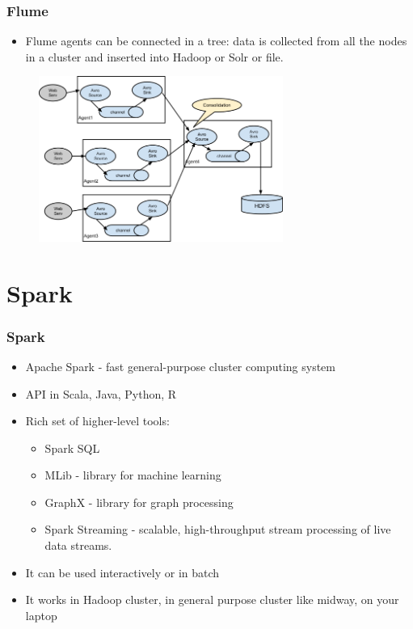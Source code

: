 \documentclass{beamer}
\begin{document}
\begin{frame}[fragile]
 \frametitle{Flume}
 \begin{itemize}
  \item Flume agents can be connected in a tree: data is collected from all the nodes in a cluster and inserted into Hadoop or Solr or file.
 \end{itemize}

 \begin{figure}[h]
 \includegraphics[width=8cm]{graphs/UserGuide_image02.png}
 \end{figure}
\end{frame}

\section{Spark}
\begin{frame}
 \frametitle{Spark}
 \begin{itemize}
  \item Apache Spark - fast general-purpose cluster computing system
  \item API in Scala, Java, Python, R
  \item Rich set of higher-level tools:
    \begin{itemize}
      \item Spark SQL
      \item MLib - library for machine learning
      \item GraphX - library for graph processing
      \item Spark Streaming - scalable, high-throughput stream processing of live data streams.
    \end{itemize}
  \item It can be used interactively or in batch
  \item It works in Hadoop cluster, in general purpose cluster like midway, on your laptop
 \end{itemize}
\end{frame}
\end{document}
